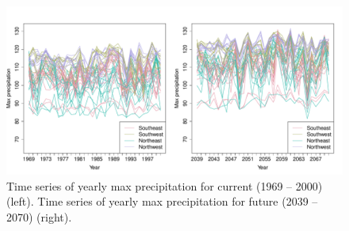 \begin{figure}[htbp]  %
  \centering
  \includegraphics[width=\linewidth]{plots/precip-ts}
  \caption{Time series of yearly max precipitation for current (1969 -- 2000) (left). Time series of yearly max precipitation for future (2039 -- 2070) (right).}
  \label{ebfig:tsprecip}
\end{figure}

